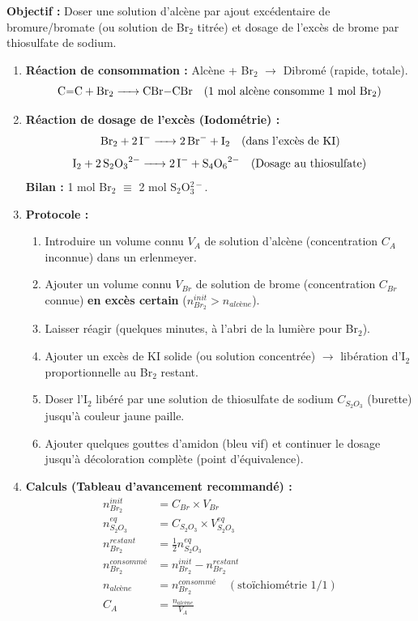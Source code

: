 \documentclass[11pt]{article}
\begin{document}
\begin{methode}
\textbf{Objectif :} Doser une solution d'alcène par ajout excédentaire de bromure/bromate (ou solution de Br$_2$ titrée) et dosage de l'excès de brome par thiosulfate de sodium.

\begin{enumerate}
    \item \textbf{Réaction de consommation :} Alcène + Br$_2$ $\rightarrow$ Dibromé (rapide, totale). 
        \[ \ce{C=C + Br2 -> CBr-CBr} \quad (1 \text{ mol alcène consomme } 1 \text{ mol Br}_2) \]
    \item \textbf{Réaction de dosage de l'excès (Iodométrie) :} 
        \[ \ce{Br2 + 2 I- -> 2 Br- + I2} \quad \text{(dans l'excès de KI)} \]
        \[ \ce{I2 + 2 S2O3^2- -> 2 I- + S4O6^2-} \quad \text{(Dosage au thiosulfate)} \]
        \textbf{Bilan :} 1 mol Br$_2$ $\equiv$ 2 mol S$_2$O$_3^{2-}$.
    \item \textbf{Protocole :}
        \begin{enumerate}
            \item Introduire un volume connu $V_A$ de solution d'alcène (concentration $C_A$ inconnue) dans un erlenmeyer.
            \item Ajouter un volume connu $V_{Br}$ de solution de brome (concentration $C_{Br}$ connue) \textbf{en excès certain} ($n_{Br_2}^{init} > n_{alcène}$).
            \item Laisser réagir (quelques minutes, à l'abri de la lumière pour Br$_2$).
            \item Ajouter un excès de KI solide (ou solution concentrée) $\rightarrow$ libération d'I$_2$ proportionnelle au Br$_2$ restant.
            \item Doser l'I$_2$ libéré par une solution de thiosulfate de sodium $C_{S_2O_3}$ (burette) jusqu'à couleur jaune paille.
            \item Ajouter quelques gouttes d'amidon (bleu vif) et continuer le dosage jusqu'à décoloration complète (point d'équivalence).
        \end{enumerate}
    \item \textbf{Calculs (Tableau d'avancement recommandé) :}
        \begin{align*}
            n_{Br_2}^{init} &= C_{Br} \times V_{Br} \\
            n_{S_2O_3}^{eq} &= C_{S_2O_3} \times V_{S_2O_3}^{eq} \\
            n_{Br_2}^{restant} &= \frac{1}{2} n_{S_2O_3}^{eq} \\
            n_{Br_2}^{consommé} &= n_{Br_2}^{init} - n_{Br_2}^{restant} \\
            n_{alcène} &= n_{Br_2}^{consommé} \quad (\text{stoïchiométrie 1/1}) \\
            C_A &= \frac{n_{alcène}}{V_A}
        \end{align*}
\end{enumerate}
\end{methode}
\end{document}
